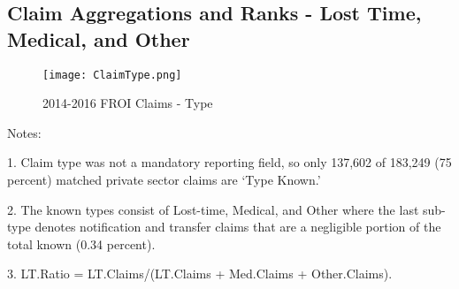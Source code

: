 \documentclass[9pt, oneside]{article}   	%
\begin{document}
\pagebreak

\subsection{Claim Aggregations and Ranks - Lost Time, Medical, and  Other}

\setcounter{table}{0}
\renewcommand{\thetable}{T\arabic{table}}





\begin{figure}[h]
\caption{2014-2016 FROI Claims - Type}
\hspace{1.5 in}

\label{Fig:ClaimType}
\begin{center}
\texttt{[image: ClaimType.png]}
\end{center}
\end{figure}

    \begin{tablenotes}
      \small
      Notes:
      \\
            \item 1. Claim type was not a mandatory reporting field, so only 137,602 of 183,249 (75 percent) matched private sector claims are  `Type Known.'  \\
            \item 2. The known types consist of Lost-time, Medical, and Other where the last sub-type denotes notification and transfer claims that are a negligible portion of the total known (0.34 percent). \\
            \item 3. LT.Ratio = LT.Claims/(LT.Claims + Med.Claims + Other.Claims).\\

    \end{tablenotes}

\pagebreak





\end{document}
